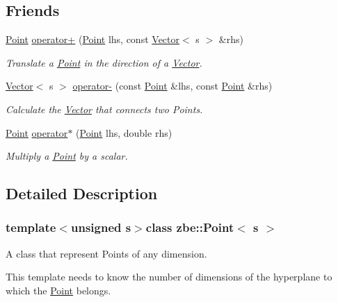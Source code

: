 \subsection*{Friends}
\begin{DoxyCompactItemize}
\item 
\hyperlink{classzbe_1_1_point}{Point} \hyperlink{classzbe_1_1_point_a74ace46c2a8478251d76bceef6715c6d}{operator+} (\hyperlink{classzbe_1_1_point}{Point} lhs, const \hyperlink{classzbe_1_1_vector}{Vector}$<$ s $>$ \&rhs)
\begin{DoxyCompactList}\small\item\em Translate a \hyperlink{classzbe_1_1_point}{Point} in the direction of a \hyperlink{classzbe_1_1_vector}{Vector}. \end{DoxyCompactList}\item 
\hyperlink{classzbe_1_1_vector}{Vector}$<$ s $>$ \hyperlink{classzbe_1_1_point_afd14d87b02bf3ff8a034483748ba0f44}{operator-\/} (const \hyperlink{classzbe_1_1_point}{Point} \&lhs, const \hyperlink{classzbe_1_1_point}{Point} \&rhs)
\begin{DoxyCompactList}\small\item\em Calculate the \hyperlink{classzbe_1_1_vector}{Vector} that connects two Points. \end{DoxyCompactList}\item 
\hyperlink{classzbe_1_1_point}{Point} \hyperlink{classzbe_1_1_point_a5a5836772aa1d8dd4666c553c9b1ce45}{operator$\ast$} (\hyperlink{classzbe_1_1_point}{Point} lhs, double rhs)
\begin{DoxyCompactList}\small\item\em Multiply a \hyperlink{classzbe_1_1_point}{Point} by a scalar. \end{DoxyCompactList}\end{DoxyCompactItemize}


\subsection{Detailed Description}
\subsubsection*{template$<$unsigned s$>$class zbe\+::\+Point$<$ s $>$}

A class that represent Points of any dimension. 

This template needs to know the number of dimensions of the hyperplane to which the \hyperlink{classzbe_1_1_point}{Point} belongs. 

